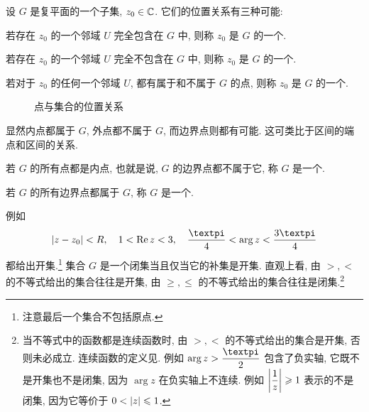 设 $G$ 是复平面的一个子集, $z_0\in{\mathbb{C}}$.
它们的位置关系有三种可能:
\begin{enuma}
  \item 若存在 $z_0$ 的一个邻域 $U$ 完全包含在 $G$ 中, 则称 $z_0$ 是 $G$ 的一个.
  \item 若存在 $z_0$ 的一个邻域 $U$ 完全不包含在 $G$ 中, 则称 $z_0$ 是 $G$ 的一个.
  \item 若对于 $z_0$ 的任何一个邻域 $U$, 都有属于和不属于 $G$ 的点, 则称 $z_0$ 是 $G$ 的一个.
\end{enuma}

\begin{figure}[H]
  \centering
  \caption{点与集合的位置关系}
\end{figure}

显然内点都属于 $G$, 外点都不属于 $G$, 而边界点则都有可能.
这可类比于区间的端点和区间的关系.

\begin{definition}
  \begin{enuma}
    \item 若 $G$ 的所有点都是内点, 也就是说, $G$ 的边界点都不属于它, 称 $G$ 是一个.
    \item 若 $G$ 的所有边界点都属于 $G$, 称 $G$ 是一个.
  \end{enuma}
\end{definition}

例如
\[
  \abs{z-z_0}<R,\quad 1<\Re z<3,\quad\frac\cpi4<\arg z<\frac{3\cpi}4
\]
都给出开集.\footnote{
  注意最后一个集合不包括原点.
}
集合 $G$ 是一个闭集当且仅当它的补集是开集.
直观上看, 由 $>,<$ 的不等式给出的集合往往是开集, 由 $\ge,\le$ 的不等式给出的集合往往是闭集.\footnote{%
  当不等式中的函数都是连续函数时, 由 $>,<$ 的不等式给出的集合是开集, 否则未必成立.
  连续函数的定义见.
  例如 $\arg z>\dfrac\cpi2$ 包含了负实轴, 它既不是开集也不是闭集, 因为 $\arg z$ 在负实轴上不连续.
  例如 $\biggl\vert\dfrac1z\biggr\vert\geqslant 1$ 表示的不是闭集, 因为它等价于 $0<\lvert z\rvert\leqslant1$.
}

